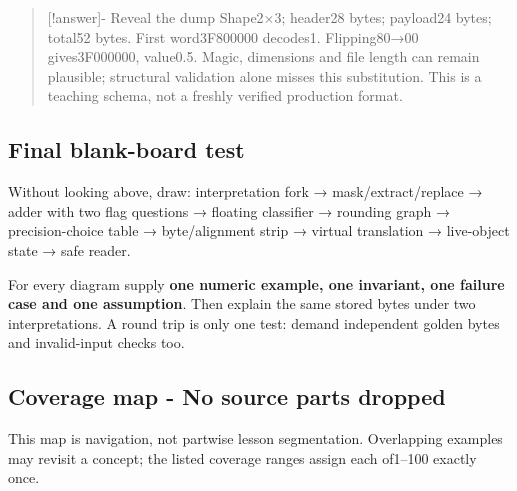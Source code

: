 \begin{quote}
{[}!answer{]}- Reveal the dump Shape2×3; header28 bytes; payload24 bytes; total52 bytes. First word3F800000 decodes1. Flipping80→00 gives3F000000, value0.5. Magic, dimensions and file length can remain plausible; structural validation alone misses this substitution. This is a teaching schema, not a freshly verified production format.
\end{quote}

\subsection{Final blank-board test}\label{appendix-ef4d27797a92-final-blank-board-test}

Without looking above, draw: interpretation fork → mask/extract/replace → adder with two flag questions → floating classifier → rounding graph → precision-choice table → byte/alignment strip → virtual translation → live-object state → safe reader.

For every diagram supply \textbf{one numeric example, one invariant, one failure case and one assumption}. Then explain the same stored bytes under two interpretations. A round trip is only one test: demand independent golden bytes and invalid-input checks too.

\subsection{Coverage map - No source parts dropped}\label{appendix-ef4d27797a92-coverage-map---no-source-parts-dropped}

This map is navigation, not partwise lesson segmentation. Overlapping examples may revisit a concept; the listed coverage ranges assign each of1--100 exactly once.


